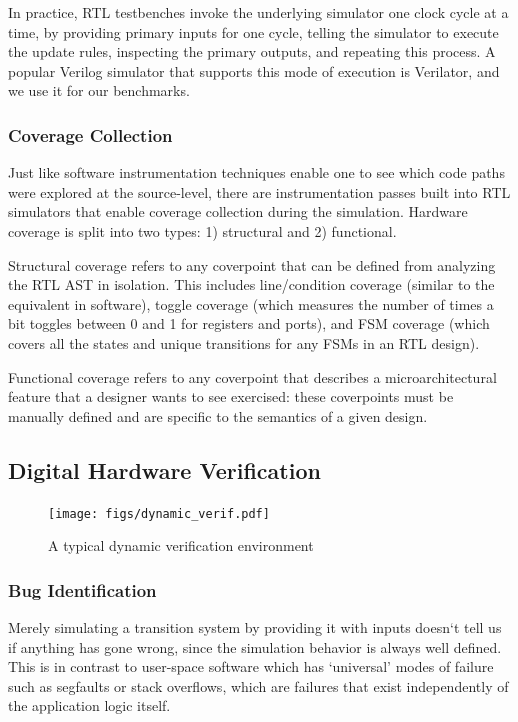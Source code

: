 \documentclass[sigconf,noacm]{acmart}
\begin{document}
In practice, RTL testbenches invoke the underlying simulator one clock cycle at a time, by providing primary inputs for one cycle, telling the simulator to execute the update rules, inspecting the primary outputs, and repeating this process.
A popular Verilog simulator that supports this mode of execution is Verilator, and we use it for our benchmarks.

\subsubsection{Coverage Collection}

Just like software instrumentation techniques enable one to see which code paths were explored at the source-level, there are instrumentation passes built into RTL simulators that enable coverage collection during the simulation.
Hardware coverage is split into two types: 1) structural and 2) functional.

Structural coverage refers to any coverpoint that can be defined from analyzing the RTL AST in isolation.
This includes line/condition coverage (similar to the equivalent in software), toggle coverage (which measures the number of times a bit toggles between 0 and 1 for registers and ports), and FSM coverage (which covers all the states and unique transitions for any FSMs in an RTL design).

Functional coverage refers to any coverpoint that describes a microarchitectural feature that a designer wants to see exercised: these coverpoints must be manually defined and are specific to the semantics of a given design.


\subsection{Digital Hardware Verification}

\begin{figure}
  \texttt{[image: figs/dynamic\_verif.pdf]}
  \caption{A typical dynamic verification environment}
  \label{fig:dynamic_verif}
\end{figure}

\subsubsection{Bug Identification}

Merely simulating a transition system by providing it with inputs doesn`t tell us if anything has gone wrong, since the simulation behavior is always well defined.
This is in contrast to user-space software which has `universal' modes of failure such as segfaults or stack overflows, which are failures that exist independently of the application logic itself.
\end{document}
